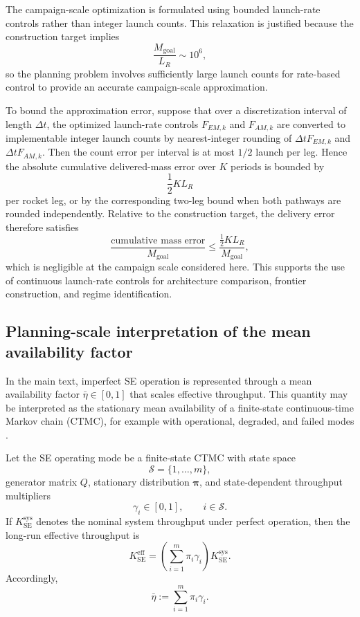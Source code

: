 \documentclass[12pt]{article}
\begin{document}
The campaign-scale optimization is formulated using bounded launch-rate controls rather than integer launch counts. This relaxation is justified because the construction target implies
\[
\frac{M_{\mathrm{goal}}}{L_R}\sim 10^6,
\]
so the planning problem involves sufficiently large launch counts for rate-based control to provide an accurate campaign-scale approximation.

To bound the approximation error, suppose that over a discretization interval of length $\Delta t$, the optimized launch-rate controls $F_{EM,k}$ and $F_{AM,k}$ are converted to implementable integer launch counts by nearest-integer rounding of $\Delta t F_{EM,k}$ and $\Delta t F_{AM,k}$. Then the count error per interval is at most $1/2$ launch per leg. Hence the absolute cumulative delivered-mass error over $K$ periods is bounded by
\[
\frac{1}{2} K L_R
\]
per rocket leg, or by the corresponding two-leg bound when both pathways are rounded independently. Relative to the construction target, the delivery error therefore satisfies
\[
\frac{\text{cumulative mass error}}{M_{\mathrm{goal}}}
\le
\frac{\tfrac12 K L_R}{M_{\mathrm{goal}}},
\]
which is negligible at the campaign scale considered here. This supports the use of continuous launch-rate controls for architecture comparison, frontier construction, and regime identification.

\subsection{Planning-scale interpretation of the mean availability factor}
\label{app:ctmc_eta}

In the main text, imperfect SE operation is represented through a mean availability factor $\bar{\eta}\in[0,1]$ that scales effective throughput. This quantity may be interpreted as the stationary mean availability of a finite-state continuous-time Markov chain (CTMC), for example with operational, degraded, and failed modes \cite{Norris1998MarkovChains}.

Let the SE operating mode be a finite-state CTMC with state space
\[
\mathcal{S}=\{1,\dots,m\},
\]
generator matrix $Q$, stationary distribution $\boldsymbol{\pi}$, and state-dependent throughput multipliers
\[
\gamma_i\in[0,1],\qquad i\in\mathcal{S}.
\]
If $K_{\mathrm{SE}}^{\mathrm{sys}}$ denotes the nominal system throughput under perfect operation, then the long-run effective throughput is
\[
K_{\mathrm{SE}}^{\mathrm{eff}}
=
\left(\sum_{i=1}^m \pi_i \gamma_i\right)K_{\mathrm{SE}}^{\mathrm{sys}}.
\]
Accordingly,
\[
\bar{\eta}:=\sum_{i=1}^m \pi_i \gamma_i .
\]
\end{document}
